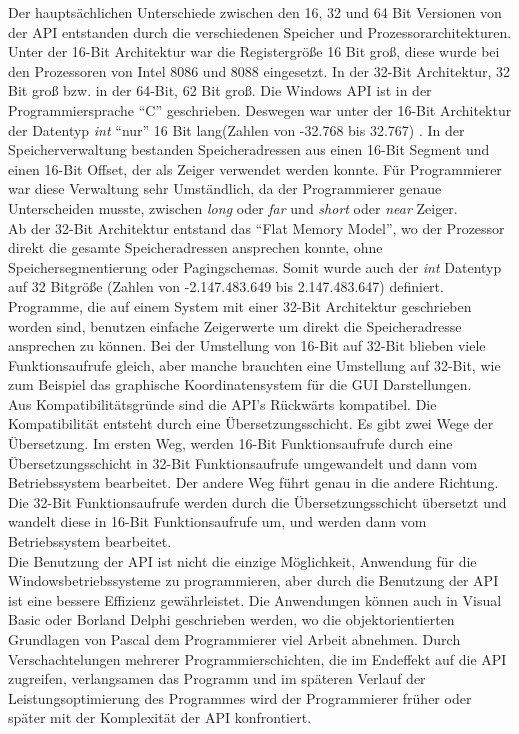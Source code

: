 Der hauptsächlichen Unterschiede zwischen den 16, 32 und 64 Bit Versionen von der API entstanden durch die verschiedenen Speicher und Prozessorarchitekturen. Unter der 16-Bit Architektur war die Registergröße 16 Bit groß, diese wurde bei den Prozessoren von Intel 8086 und 8088 eingesetzt. In der 32-Bit Architektur, 32 Bit groß bzw. in der 64-Bit, 62 Bit groß. Die Windows API ist in der Programmiersprache "`C"' geschrieben. Deswegen war unter der 16-Bit Architektur der Datentyp \textit{int} "`nur"' 16 Bit lang(Zahlen von -32.768 bis 32.767) . In der Speicherverwaltung bestanden Speicheradressen aus einen 16-Bit Segment und einen 16-Bit Offset, der als Zeiger verwendet werden konnte. Für Programmierer war diese Verwaltung sehr Umständlich, da der Programmierer genaue Unterscheiden musste, zwischen \textit{long} oder \textit{far} und \textit{short} oder \textit{near} Zeiger. 
\\

Ab der 32-Bit Architektur entstand das "`Flat Memory Model"', wo der Prozessor direkt die gesamte Speicheradressen ansprechen konnte, ohne Speichersegmentierung oder Pagingschemas. Somit wurde auch der \textit{int} Datentyp auf 32 Bitgröße (Zahlen von -2.147.483.649 bis 2.147.483.647) definiert. Programme, die auf einem System mit einer 32-Bit Architektur geschrieben worden sind, benutzen einfache Zeigerwerte um direkt die Speicheradresse ansprechen zu können. Bei der Umstellung von 16-Bit auf 32-Bit blieben viele Funktionsaufrufe gleich, aber manche brauchten eine Umstellung auf 32-Bit, wie zum Beispiel das graphische Koordinatensystem für die GUI Darstellungen.
\\

Aus Kompatibilitätsgründe sind die API's Rückwärts kompatibel. Die Kompatibilität entsteht durch eine Übersetzungsschicht. Es gibt zwei Wege der Übersetzung. Im ersten Weg, werden 16-Bit Funktionsaufrufe durch eine Übersetzungsschicht in 32-Bit Funktionsaufrufe umgewandelt und dann vom Betriebssystem bearbeitet. Der andere Weg führt genau in die andere Richtung. Die 32-Bit Funktionsaufrufe werden durch die Übersetzungsschicht übersetzt und wandelt diese in 16-Bit Funktionsaufrufe um, und werden dann vom Betriebssystem bearbeitet.
\\

Die Benutzung der API ist nicht die einzige Möglichkeit, Anwendung für die Windowsbetriebssysteme zu programmieren, aber durch die Benutzung der API ist eine bessere Effizienz gewährleistet. Die Anwendungen können auch in Visual Basic oder Borland Delphi geschrieben werden, wo die objektorientierten Grundlagen von Pascal dem Programmierer viel Arbeit abnehmen. Durch Verschachtelungen mehrerer Programmierschichten, die im Endeffekt auf die  API zugreifen, verlangsamen das Programm und im späteren Verlauf der Leistungsoptimierung des Programmes wird der Programmierer früher oder später mit der Komplexität der API konfrontiert.

